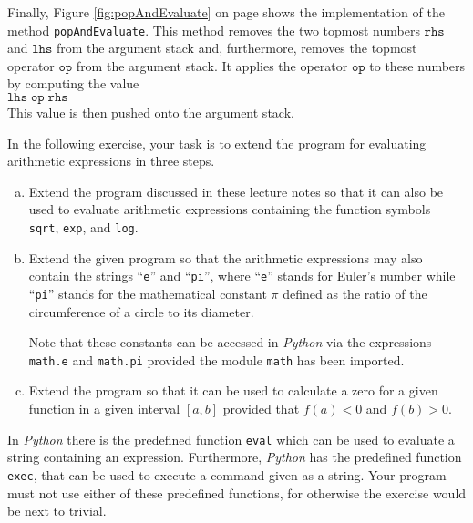 Finally, Figure \ref{fig:popAndEvaluate} on page \pageref{fig:popAndEvaluate} shows the implementation of the
method \texttt{popAndEvaluate}.
This method removes the two topmost numbers $\texttt{rhs}$ and $\texttt{lhs}$ from the argument stack and,
furthermore, removes the topmost operator $\texttt{op}$ from the argument stack.  It applies the operator
$\texttt{op}$ to these numbers 
by computing the value 
\\[0.2cm]
\hspace*{1.3cm}
$ \texttt{lhs} \;\texttt{op}\; \texttt{rhs} $
\\[0.2cm]
This value is then pushed onto the argument stack.

\exercise
In the following exercise, your task is to extend the program for evaluating arithmetic expressions in three steps.
\begin{enumerate}[(a)]
\item Extend the program discussed in these lecture notes so that it can also be used to evaluate
      arithmetic expressions containing the function symbols
      \\[0.2cm]
      \hspace*{1.3cm}
      \texttt{sqrt}, \texttt{exp}, and \texttt{log}.
\item Extend the given program so that the arithmetic expressions may also contain 
      the strings ``\texttt{e}'' and ``\texttt{pi}'', where ``\texttt{e}'' stands for 
      \href{http://en.wikipedia.org/wiki/E_(mathematical_constant)}{Euler's number} 
      while ``\texttt{pi}'' stands for the mathematical constant
      \href{http://en.wikipedia.org/wiki/Pi}{$\pi$} defined as the ratio of the circumference of a
      circle to its diameter. 

      Note that these constants can be accessed in \textsl{Python} via the expressions \texttt{math.e}
      and \texttt{math.pi} provided the module \texttt{math} has been imported.
\item Extend the program so that it can be used to calculate a zero for a given function in a given
      interval $[a,b]$ provided that $f(a) < 0$ and $f(b) > 0$.  
\end{enumerate}
In \textsl{Python} there is the predefined function \texttt{eval} which can be used to evaluate a string
containing an expression.  Furthermore, \textsl{Python} has the predefined function \texttt{exec}, that can be
used to execute a command given as a string.  Your program must not use either of these predefined functions,
for otherwise the exercise would be next to trivial.
\eox


